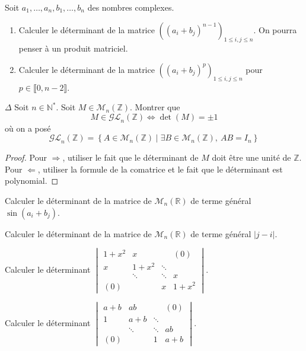 \documentclass[french,a4paper]{article}
\newcommand{\N}{\mathbb{N}}
\newcommand{\Z}{\mathbb{Z}}
\newcommand{\R}{\mathbb{R}}
\newcommand{\st}{^*}
\theoremstyle{plain}
\theoremstyle{definition}
\theoremstyle{remark}
\begin{document}
\begin{ex}{}
	Soit $a_1,\ldots,a_n,b_1,\ldots,b_n$ des nombres complexes.
	\begin{enumerate}
		\item Calculer le déterminant de la matrice $((a_i+b_j)^{n-1})_{1\leqslant i,j\leqslant n}$. On pourra penser à un produit matriciel.
		\item Calculer le déterminant de la matrice $((a_i+b_j)^{p})_{1\leqslant i,j\leqslant n}$ pour $p\in\llbracket 0,n-2\rrbracket$.
	\end{enumerate}
\end{ex}

\begin{ex}{$\Delta$}
	Soit $n \in \N\st$.
	Soit $M \in \mathcal{M}_n(\Z)$. Montrer que $$ M \in \mathcal{GL}_n(\Z) \Longleftrightarrow \det(M)=\pm 1 $$ où on a posé $$\mathcal{GL}_n(\Z)=\left\{A \in \mathcal{M}_n(\Z) \mid \exists B \in \mathcal{M}_n(\Z), \ AB=I_n\right\}$$
\end{ex}
\begin{proof}
	Pour $\Longrightarrow$, utiliser le fait que le déterminant de $M$ doit être une unité de $\Z$. Pour $\Longleftarrow$, utiliser la formule de la comatrice et le fait que le déterminant est polynomial.
\end{proof}

\begin{ex}{}
	Calculer le déterminant de la matrice de $\mathcal{M}_n(\R)$ de terme général $\sin(a_i+b_j)$.
\end{ex}

\begin{ex}{}
	Calculer le déterminant de la matrice de $\mathcal{M}_n(\R)$ de terme général $\lvert j-i\rvert$.
\end{ex}

\begin{ex}{}
	Calculer le déterminant $\displaystyle\begin{vmatrix}
		1+x^2&x&&(0)\\
		x&1+x^2&\ddots&\\
		&\ddots&\ddots&x\\
		(0)&&x&1+x^2
	\end{vmatrix}$.
\end{ex}

\begin{ex}{}
	Calculer le déterminant $\displaystyle\begin{vmatrix}
		a+b&ab&&(0)\\
		1&a+b&\ddots&\\
		&\ddots&\ddots&ab\\
		(0)&&1&a+b
	\end{vmatrix}$.
\end{ex}
\end{document}
